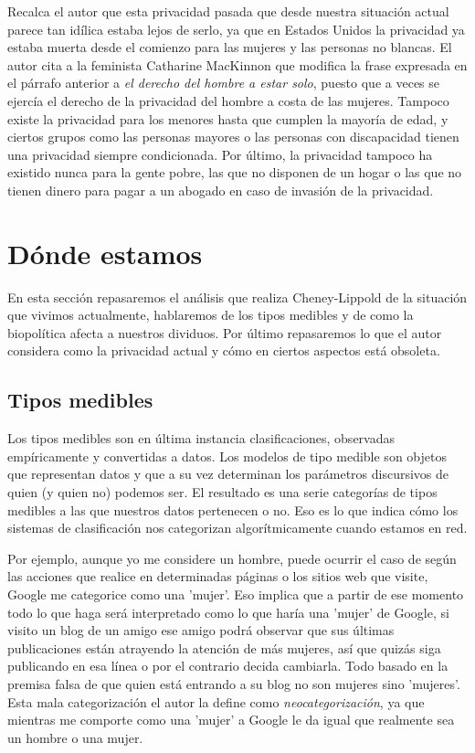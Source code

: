 \documentclass[11pt]{article}
\begin{document}
Recalca el autor que esta privacidad pasada que desde nuestra situación actual parece tan idílica estaba lejos de serlo, ya que en Estados Unidos la privacidad ya estaba muerta desde el comienzo para las mujeres y las personas no blancas. El autor cita a la feminista Catharine MacKinnon que modifica la frase expresada en el párrafo anterior a \textit{el derecho del hombre a estar solo}, puesto que a veces se ejercía el derecho de la privacidad del hombre a costa de las mujeres. Tampoco existe la privacidad para los menores hasta que cumplen la mayoría de edad, y ciertos grupos como las personas mayores o las personas con discapacidad tienen una privacidad siempre condicionada. Por último, la privacidad tampoco ha existido nunca para la gente pobre, las que no disponen de un hogar o las que no tienen dinero para pagar a un abogado en caso de invasión de la privacidad.
\section{Dónde estamos}
En esta sección repasaremos el análisis que realiza Cheney-Lippold de la situación que vivimos actualmente, hablaremos de los tipos medibles y de como la biopolítica afecta a nuestros dividuos. Por último repasaremos lo que el autor considera como la privacidad actual y cómo en ciertos aspectos está obsoleta.
\subsection{Tipos medibles}
Los tipos medibles son en última instancia clasificaciones, observadas empíricamente y convertidas a datos. Los modelos de tipo medible son objetos que representan datos y que a su vez determinan los parámetros discursivos de quien (y quien no) podemos ser. El resultado es una serie categorías de tipos medibles a las que nuestros datos pertenecen o no. Eso es lo que indica cómo los sistemas de clasificación nos categorizan algorítmicamente cuando estamos en red.

Por ejemplo, aunque yo me considere un hombre, puede ocurrir el caso de según las acciones que realice en determinadas páginas o los sitios web que visite, Google me categorice como una 'mujer'. Eso implica que a partir de ese momento todo lo que haga será interpretado como lo que haría una 'mujer' de Google, si visito un blog de un amigo ese amigo podrá observar que sus últimas publicaciones están atrayendo la atención de más mujeres, así que quizás siga publicando en esa línea o por el contrario decida cambiarla. Todo basado en la premisa falsa de que quien está entrando a su blog no son mujeres sino 'mujeres'. Esta mala categorización el autor la define como \textit{neocategorización}, ya que mientras me comporte como una 'mujer' a Google le da igual que realmente sea un hombre o una mujer.
\end{document}
